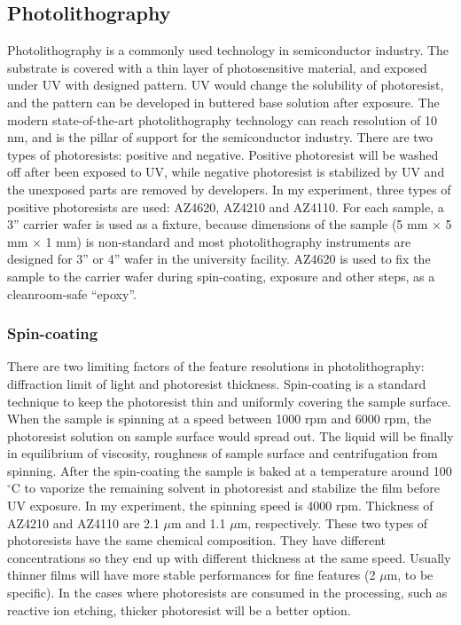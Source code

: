 \documentclass[pdflatex, sectionletters, 12pt]{pittetd}    %
\begin{document}


\subsection{Photolithography}
\label{SEC:Photolithography}

Photolithography is a commonly used technology in semiconductor industry. The substrate is covered with a thin layer of photosensitive material, and exposed under UV with designed pattern. UV would change the solubility of photoresist, and the pattern can be developed in buttered base solution after exposure. The modern state-of-the-art photolithography technology can reach resolution of 10 nm, and is the pillar of support for the semiconductor industry. There are two types of photoresists: positive and negative. Positive photoresist will be washed off after been exposed to UV, while negative photoresist is stabilized by UV and the unexposed parts are removed by developers. In my experiment, three types of positive photoresists are used: AZ4620, AZ4210 and AZ4110. For each sample, a 3'' carrier wafer is used as a fixture, because dimensions of the sample (5 mm $\times$ 5 mm $\times$ 1 mm) is non-standard and most photolithography instruments are designed for 3'' or 4'' wafer in the university facility. AZ4620 is used to fix the sample to the carrier wafer during spin-coating, exposure and other steps, as a cleanroom-safe ``epoxy''. 


\subsubsection{Spin-coating}

There are two limiting factors of the feature resolutions in photolithography: diffraction limit of light and photoresist thickness. Spin-coating is a standard technique to keep the photoresist thin and uniformly covering the sample surface. When the sample is spinning at a speed between 1000 rpm and 6000 rpm, the photoresist solution on sample surface would spread out. The liquid will be finally in equilibrium of viscosity, roughness of sample surface and centrifugation from spinning. After the spin-coating the sample is baked at a temperature around 100$^{\circ}$C to vaporize the remaining solvent in photoresist and stabilize the film before UV exposure. In my experiment, the spinning speed is 4000 rpm. Thickness of AZ4210 and AZ4110 are 2.1 $\mu$m and 1.1 $\mu$m, respectively. These two types of photoresists have the same chemical composition. They have different concentrations so they end up with different thickness at the same speed. Usually thinner films will have more stable performances for fine features (2 $\mu$m, to be specific). In the cases where photoresists are consumed in the processing, such as reactive ion etching, thicker photoresist will be a better option.
\end{document}
